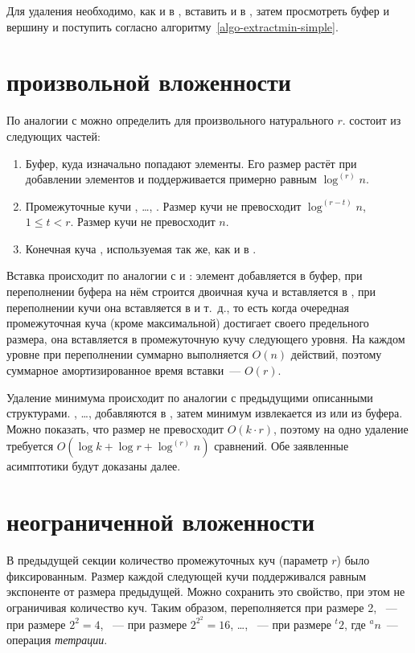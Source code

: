 Для удаления необходимо, как и в \SCH, вставить \MH[2] и \MH[1] в \HH,
затем просмотреть буфер и вершину \HH и поступить согласно
алгоритму~\ref{algo-extractmin-simple}.


\section{\CH произвольной вложенности}
По аналогии с \CH[2] можно определить \CH[r] для произвольного натурального $r$.  
\CH[r] состоит из следующих частей:

\begin{enumerate}
\item Буфер, куда изначально попадают элементы. Его размер растёт при добавлении
    элементов и поддерживается примерно равным $\log^{(r)} n$.
\item Промежуточные кучи \MH[1], \dots, \MH[r]. Размер кучи \MH[t] не превосходит
    $\log^{(r-t)} n$, $1 \leq t < r$. Размер кучи \MH[r] не превосходит $n$.
\item Конечная куча \HH, используемая так же, как и в \SCH.
\end{enumerate}

Вставка происходит по аналогии с \SCH и \CH[2]: элемент добавляется в буфер,
при переполнении буфера на нём строится двоичная куча и вставляется в \MH[1],
при переполнении кучи \MH[1] она вставляется в \MH[2] и т.~д., то есть
когда очередная промежуточная куча (кроме максимальной) достигает своего предельного
размера, она вставляется в промежуточную кучу следующего уровня.
На каждом уровне при переполнении суммарно выполняется $O(n)$ действий,
поэтому суммарное амортизированное время вставки~--- $O(r)$.

Удаление минимума происходит по аналогии с предыдущими описанными структурами.
\MH[1], \dots, \MH[r] добавляются в \HH, затем минимум извлекается из \HH
или из буфера. Можно показать, что размер \HH не превосходит
$O(k \cdot r)$, поэтому на одно удаление требуется $O(\log k + \log r + \log^{(r)} n)$
сравнений. Обе заявленные асимптотики будут доказаны далее.

\section{\CH неограниченной вложенности}

В предыдущей секции количество промежуточных куч (параметр $r$) было фиксированным.
Размер каждой следующей кучи поддерживался равным экспоненте от размера
предыдущей. Можно сохранить это свойство, при этом не ограничивая количество куч.
Таким образом, \MH[1] переполняется при размере 2, \MH[2]~--- при размере $2^2 = 4$,
\MH[3]~--- при размере $2^{2^2} = 16$, \dots, \MH[t]~--- при размере ${}^{t}2$,
где ${}^{a}n$~--- операция \emph{тетрации}.

